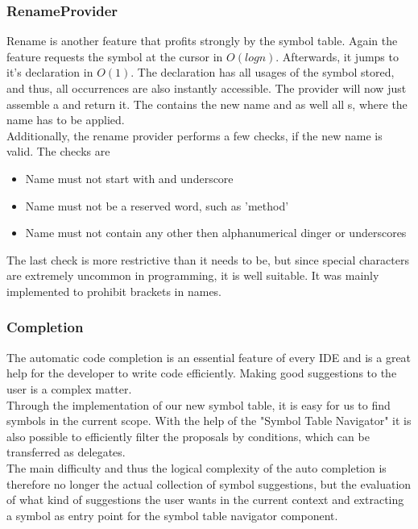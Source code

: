 \subsubsection{RenameProvider}
Rename is another feature that profits strongly by the symbol table.
Again the feature requests the symbol at the cursor in $O(logn)$.
Afterwards, it jumps to it's declaration in $O(1)$.
The declaration has all usages of the symbol stored, and thus, all occurrences are also instantly accessible.
The provider will now just assemble a  and return it.
The  contains the new name and as well all s, where the name has to be applied.\\

Additionally, the rename provider performs a few checks, if the new name is valid.
The checks are
\begin{itemize}
    \item Name must not start with and underscore
    \item Name must not be a reserved word, such as 'method'
    \item Name must not contain any other then alphanumerical dinger or underscores
\end{itemize}

The last check is more restrictive than it needs to be, but since special characters are extremely uncommon in programming, it is well suitable.
It was mainly implemented to prohibit brackets in names.

\subsubsection{Completion}
\label{section:implementation:core:completion}
The automatic code completion is an essential feature of every IDE and is a great help for the developer to write code efficiently.
Making good suggestions to the user is a complex matter. \\

Through the implementation of our new symbol table, it is easy for us to find symbols in the current scope.
With the help of the "Symbol Table Navigator"
it is also possible to efficiently filter the proposals by conditions,
which can be transferred as delegates. \\

The main difficulty and thus the logical complexity of the auto completion
is therefore no longer the actual collection of symbol suggestions,
but the evaluation of what kind of suggestions the user wants in the current context
and extracting a symbol as entry point for the symbol table navigator component. \\

